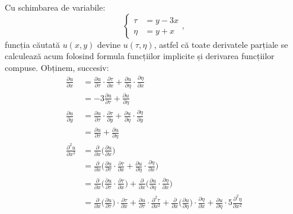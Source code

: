 \documentclass[11pt,a4paper]{article}
\theoremstyle{dotless}
\theoremstyle{dotlessdr}
\begin{document}
Cu schimbarea de variabile:
\[
  \begin{cases}
    \tau &= y - 3x \\
    \eta &= y + x
  \end{cases},
\]
funcția căutată $ u(x, y) $ devine $ u(\tau, \eta) $, astfel că toate derivatele parțiale
se calculează acum folosind formula funcțiilor implicite și derivarea funcțiilor compuse. Obținem, succesiv:
\begin{align*}
  \frac{\partial u}{\partial x} &= \frac{\partial u}{\partial \tau} \cdot \frac{\partial \tau}{\partial x} + %
                                  \frac{\partial u}{\partial \eta} \cdot \frac{\partial \eta}{\partial x} \\
                                &=- 3\frac{\partial u}{\partial \tau} + \frac{\partial u}{\partial \eta} \\
  \frac{\partial u}{\partial y} &= \frac{\partial u}{\partial \tau} \cdot \frac{\partial \tau}{\partial y} + %
                                  \frac{\partial u}{\partial \eta} \cdot \frac{\partial \eta}{\partial y} \\
                                &=\frac{\partial u}{\partial \tau} + \frac{\partial u}{\partial \eta} \\
  \frac{\partial^2 u}{\partial x^2} &= \frac{\partial}{\partial x} \Big( \frac{\partial u}{\partial x} \Big)  \\
                                &= \frac{\partial}{\partial x} \Big( \frac{\partial u}{\partial \tau} \cdot %
                                  \frac{\partial \tau}{\partial x} + \frac{\partial u}{\partial \eta} \cdot \frac{\partial \eta}{\partial x} \Big) \\
                                &= \frac{\partial}{\partial x} \Big( \frac{\partial u}{\partial \tau} \cdot \frac{\partial \tau}{\partial x}\Big) + %
                                  \frac{\partial}{\partial x} \Big( \frac{\partial u}{\partial \eta} \cdot \frac{\partial \eta}{\partial x} \Big) \\
                                &= \frac{\partial}{\partial x} \Big( \frac{\partial u}{\partial \tau} \Big) \cdot %
                                  \frac{\partial \tau}{\partial x} + \frac{\partial u}{\partial \tau} \cdot %
                                  \frac{\partial^2 \tau}{\partial x^2} + \frac{\partial}{\partial x} \Big( \frac{\partial u}{\partial \eta} \Big) \cdot %
                                  \frac{\partial \eta}{\partial x} + \frac{\partial u}{\partial \eta} \cdot 5
                                  \frac{\partial^2 \eta}{\partial x^2} \\

\end{align*}
\end{document}

